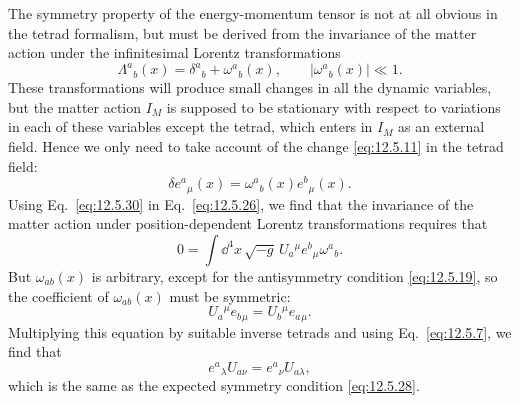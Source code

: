 The symmetry property of the energy-momentum tensor is not at all obvious in
the tetrad formalism, but must be derived from the invariance of the matter
action under the infinitesimal Lorentz transformations
\[
  \Lambda^a{}_b(x)
  =
  \delta^a{}_b+\omega^a{}_b(x),
  \qquad
  \lvert\omega^a{}_b(x)\rvert\ll1.
\]
These transformations will produce small changes in all the dynamic
variables, but the matter action \(I_M\) is supposed to be stationary with
respect to variations in each of these variables except the tetrad, which
enters in \(I_M\) as an external field. Hence we only need to take account of
the change \eqref{eq:12.5.11} in the tetrad field:
\begin{equation}
  \delta e^a{}_\mu(x)
  =
  \omega^a{}_b(x)e^b{}_\mu(x).
  \tag{12.5.30}\label{eq:12.5.30}
\end{equation}
Using Eq.~\eqref{eq:12.5.30} in Eq.~\eqref{eq:12.5.26}, we find that the
invariance of the matter action under position-dependent Lorentz
transformations requires that
\[
  0
  =
  \int\dd^4x\,\sqrt{-g}\,
  U_a{}^\mu e^b{}_\mu\omega^a{}_b.
\]
But \(\omega_{ab}(x)\) is arbitrary, except for the antisymmetry condition
\eqref{eq:12.5.19}, so the coefficient of \(\omega_{ab}(x)\) must be
symmetric:
\[
  U_a{}^\mu e_b{}_\mu
  =
  U_b{}^\mu e_a{}_\mu.
\]
Multiplying this equation by suitable inverse tetrads and using
Eq.~\eqref{eq:12.5.7}, we find that
\begin{equation}
  e^a{}_\lambda U_{a\nu}
  =
  e^a{}_\nu U_{a\lambda},
  \tag{12.5.31}\label{eq:12.5.31}
\end{equation}
which is the same as the expected symmetry condition
\eqref{eq:12.5.28}.

